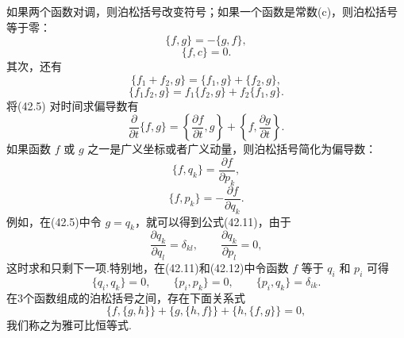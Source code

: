 如果两个函数对调，则泊松括号改变符号；如果一个函数是常数(c)，则泊松括号等于零：
\begin{equation}
  \{f,g\}=-\{g,f\},
\end{equation}
\begin{equation}
  \{f,c\}=0.
\end{equation}
其次，还有
\begin{equation}
  \{f_1+f_2,g\}=\{f_1,g\}+\{f_2,g\},
\end{equation}
\begin{equation}
  \{f_1f_2,g\}=f_1\{f_2,g\}+f_2\{f_1,g\}.
\end{equation}
将(42.5) 对时间求偏导数有
\begin{equation}
  \frac{\partial}{\partial t}\{f,g\}
  =\left\{\frac{\partial f}{\partial t},g\right\}
  +\left\{f,\frac{\partial g}{\partial t}\right\}.
\end{equation}
如果函数 $f$ 或 $g$ 之一是广义坐标或者广义动量，则泊松括号简化为偏导数：
\begin{equation}
  \{f,q_k\}=\frac{\partial f}{\partial p_k},
\end{equation}
\begin{equation}
  \{f,p_k\}=-\frac{\partial f}{\partial q_k}.
\end{equation}
例如，在(42.5)中令 $g=q_k$，就可以得到公式(42.11)，由于
\begin{equation*}
  \frac{\partial q_k}{\partial q_l}=\delta_{kl},\qquad
  \frac{\partial q_k}{\partial p_l}=0,
\end{equation*}
这时求和只剩下一项.特别地，在(42.11)和(42.12)中令函数 $f$ 等于 $q_i$ 和
$p_i$ 可得
\begin{equation}
  \{q_i,q_k\}=0,\qquad \{p_i,p_k\}=0,\qquad \{p_i,q_k\}=\delta_{ik}.
\end{equation}
在3个函数组成的泊松括号之间，存在下面关系式
\begin{equation}
  \{f,\{g,h\}\}+\{g,\{h,f\}\}+\{h,\{f,g\}\}=0,
\end{equation}
我们称之为雅可比恒等式.

